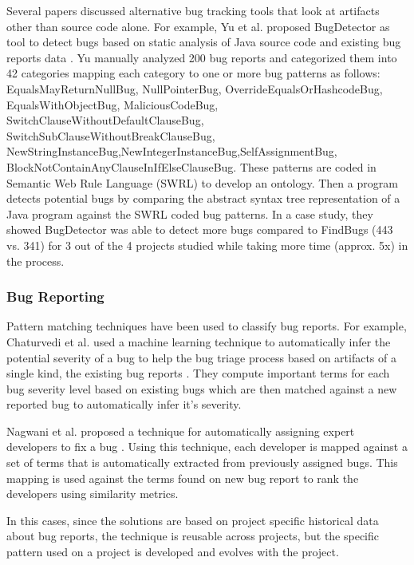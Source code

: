 \documentclass[conference]{IEEEtran}
\begin{document}
Several papers discussed alternative bug tracking tools that look at artifacts other than source code alone. For example, Yu et al. proposed BugDetector as tool to detect bugs based on static analysis of Java source code and existing bug reports data \cite{ontology_lu}. Yu manually analyzed 200 bug reports and categorized them into 42 categories mapping each category to one or more bug patterns as follows: EqualsMayReturnNullBug, NullPointerBug, OverrideEqualsOrHashcodeBug, EqualsWithObjectBug, MaliciousCodeBug, SwitchClauseWithoutDefaultClauseBug, SwitchSubClauseWithoutBreakClauseBug, NewStringInstanceBug,NewIntegerInstanceBug,SelfAssignmentBug, BlockNotContainAnyClauseInIfElseClauseBug. These patterns are coded in Semantic Web Rule Language (SWRL) to develop an ontology. Then a program detects potential bugs by comparing the abstract syntax tree representation of a Java program against the SWRL coded bug patterns. In a case study, they showed BugDetector was able to detect more bugs compared to FindBugs (443 vs. 341) for 3 out of the 4 projects studied while taking more time (approx. 5x) in the process.


\subsubsection{Bug Reporting}
Pattern matching techniques have been used to classify bug reports. For example, Chaturvedi et al. used a machine learning technique to automatically infer the potential severity of a bug to help the bug triage process based on artifacts of a single kind, the existing bug reports \cite{determining_chaturvedi}. They compute important terms for each bug severity level based on existing bugs which are then matched against a new reported bug to automatically infer it's severity.

Nagwani et al. proposed a technique for automatically assigning expert developers to fix a bug \cite{predicting_nagwani}. Using this technique, each developer is mapped against a set of terms that is automatically extracted from previously assigned bugs. This mapping is used against the terms found on new bug report to rank the developers using similarity metrics.

In this cases, since the solutions are based on project specific historical data about bug reports, the technique is reusable across projects, but the specific pattern used on a project is developed and evolves with the project.
\end{document}
